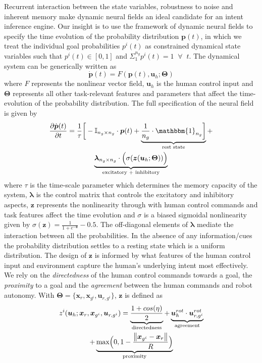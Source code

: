 Recurrent interaction between the state variables, 
robustness to noise and inherent memory make dynamic neural fields an ideal candidate for an intent inference engine. Our insight is to use the framework of dynamic neural fields to specify the time evolution of the probability distribution $\boldsymbol{p}(t)$, in which we treat the individual goal probabilities $p^i(t)$ as constrained dynamical state variables such that $p^i(t) \in [0, 1]$ and $\Sigma_{1}^{n_g}p^{i}(t) = 1 \;\;\forall\;\; t$. The dynamical system can be generically written as 
\begin{equation}
\dot{\boldsymbol{p}}(t) = F(\boldsymbol{p}(t), \boldsymbol{u}_h ; \boldsymbol{\Theta})
\end{equation}
where $F$ represents the nonlinear vector field, $\boldsymbol{u}_h$ is the human control input and $\boldsymbol{\Theta}$ represents all other task-relevant features and parameters that affect the time-evolution of the probability distribution. 
The full specification of the neural field is given by
\begin{multline}\label{eq:dft}
\frac{\partial \dot{\boldsymbol{p}}(t)}{\partial t} = \frac{1}{\tau}\bigg[-\mathbb{I}_{n_g\times n_g}\cdot\boldsymbol{p}(t) + \underbrace{\frac{1}{n_g}\cdot\mathbbm{1}_{n_g}\bigg]}_{\text{rest state}} + \\ \underbrace{\boldsymbol{\lambda}_{n_g\times n_g}\cdot\Big(\sigma(\boldsymbol{z}(\boldsymbol{u}_h;\boldsymbol{\Theta}))\Big)}_{\text{excitatory + inhibitory}}
\end{multline}
where $\tau$ is the time-scale parameter which determines the memory capacity of the system, $\boldsymbol{\lambda}$ is the control matrix that controls the excitatory and inhibitory aspects, $\boldsymbol{z}$ represents the nonlinearity through with human control commands and task features affect the time evolution and $\sigma$ is a biased sigmoidal nonlinearity given by $\sigma(\boldsymbol{z}) = \frac{1}{1 + e^{-\boldsymbol{z}}} - 0.5$.
The off-diagonal elements of $\boldsymbol{\lambda}$ mediate the interaction between all the probabilities. In the absence of any information/cues the probability distribution settles to a resting state which is a uniform distribution. The design of $\boldsymbol{z}$ is informed by what features of the human control input and environment capture the human's underlying intent most effectively. We rely on the \textit{directedness} of the human control commands towards a goal, the \textit{proximity} to a goal and the \textit{agreement} between the human commands and robot autonomy. 
With $\boldsymbol{\Theta} = \{\boldsymbol{x}_r, \boldsymbol{x}_{g^i}, \boldsymbol{u}_{r, g^i}\}$, $\boldsymbol{z}$ is defined as 
\begin{multline}
z^i(\boldsymbol{u}_h;\boldsymbol{x}_r, \boldsymbol{x}_{g^i}, \boldsymbol{u}_{r, g^i}) = \underbrace{\frac{1 + cos(\eta)}{2}}_{\text{directedness}} + \underbrace{\boldsymbol{u}_{h}^{rot}\cdot\boldsymbol{u}_{r,g^i}^{rot}}_{\text{agreement}}
\\+ \underbrace{\text{max}\Big(0, 1-\frac{\left\lVert\boldsymbol{x}_{g^i} - \boldsymbol{x}_r\right\rVert}{R}\Big)}_{\text{proximity}}
\end{multline}

